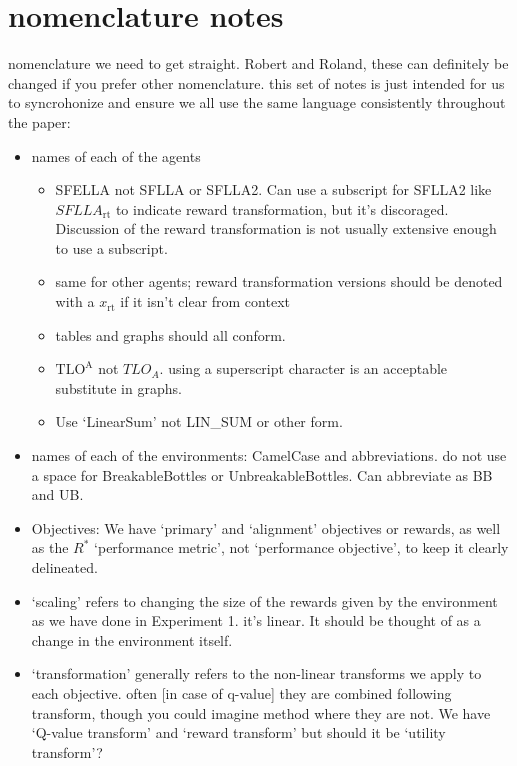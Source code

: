 \section*{nomenclature notes}
nomenclature we need to get straight. Robert and Roland, these can definitely be changed if you prefer other nomenclature. this set of notes is just intended for us to syncrohonize and ensure we all use the same language consistently throughout the paper:

\begin{itemize}
    \item names of each of the agents
        \begin{itemize}
            \item SFELLA not SFLLA or SFLLA2. Can use a subscript for SFLLA2 like $SFLLA_{\text{rt}}$ to indicate reward transformation, but it's discoraged. Discussion of the reward transformation is not usually extensive enough to use a subscript. 
            \item same for other agents; reward transformation versions should be denoted with a $x_{\text{rt}}$ if it isn't clear from context
            \item tables and graphs should all conform.
            \item $\text{TLO}^\text{A}$ not $TLO_A$. using a superscript character is an acceptable substitute in graphs.
            \item Use `LinearSum' not LIN\_SUM or other form.
        \end{itemize}
    \item names of each of the environments: CamelCase and abbreviations. do not use a space for BreakableBottles or UnbreakableBottles. Can abbreviate as BB and UB. 
    \item Objectives: We have `primary' and `alignment' objectives or rewards, as well as the $R^*$ `performance metric', not `performance objective', to keep it clearly delineated.
    \item `scaling' refers to changing the size of the rewards given by the environment as we have done in Experiment 1. it's linear. It should be thought of as a change in the environment itself.
    \item `transformation' generally refers to the non-linear transforms we apply to each objective. often [in case of q-value] they are combined following transform, though you could imagine method where they are not. We have `Q-value transform' and `reward transform' but should it be `utility transform'?
\end{itemize}

